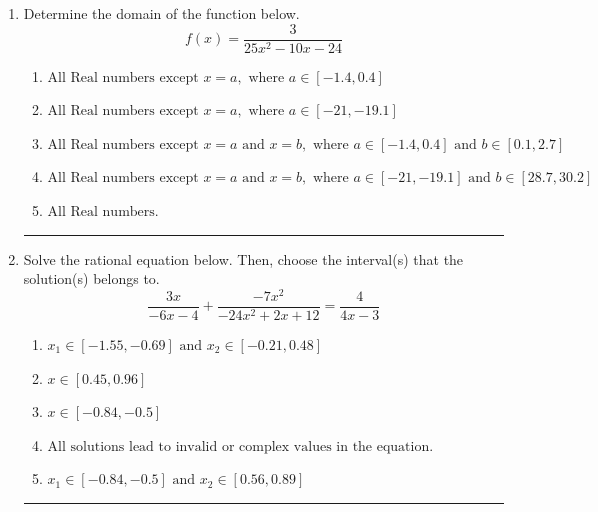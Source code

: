\documentclass[14pt]{extbook}
\newcommand{\litem}[1]{\item#1\hspace*{-1cm}\rule{\textwidth}{0.4pt}}
\begin{document}
\begin{enumerate}
{\begin{enumerate}[label=\Alph*.]
\end{enumerate} }
\litem{
Determine the domain of the function below.\[ f(x) = \frac{3}{25x^{2} -10 x -24} \]\begin{enumerate}[label=\Alph*.]
\item \( \text{All Real numbers except } x = a, \text{ where } a \in [-1.4, 0.4] \)
\item \( \text{All Real numbers except } x = a, \text{ where } a \in [-21, -19.1] \)
\item \( \text{All Real numbers except } x = a \text{ and } x = b, \text{ where } a \in [-1.4, 0.4] \text{ and } b \in [0.1, 2.7] \)
\item \( \text{All Real numbers except } x = a \text{ and } x = b, \text{ where } a \in [-21, -19.1] \text{ and } b \in [28.7, 30.2] \)
\item \( \text{All Real numbers.} \)

\end{enumerate} }
\litem{
Solve the rational equation below. Then, choose the interval(s) that the solution(s) belongs to.\[ \frac{3x}{-6x -4} + \frac{-7x^{2}}{-24x^{2} +2 x + 12} = \frac{4}{4x -3} \]\begin{enumerate}[label=\Alph*.]
\item \( x_1 \in [-1.55, -0.69] \text{ and } x_2 \in [-0.21,0.48] \)
\item \( x \in [0.45,0.96] \)
\item \( x \in [-0.84,-0.5] \)
\item \( \text{All solutions lead to invalid or complex values in the equation.} \)
\item \( x_1 \in [-0.84, -0.5] \text{ and } x_2 \in [0.56,0.89] \)

\end{enumerate} }
\end{enumerate}
\end{document}
